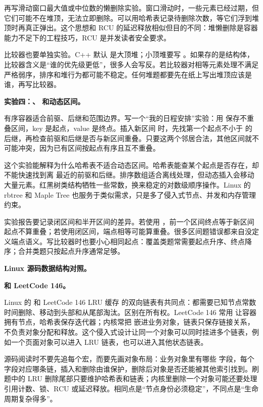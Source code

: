 再写滑动窗口最大值或中位数的懒删除实验。窗口滑动时，一些元素已经过期，但它们可能不在堆顶，无法立即删除。可以用哈希表记录待删除次数，等它们浮到堆顶时再真正弹出。这个思想和 RCU 的延迟释放相似但目的不同：堆懒删除是容器能力不足下的工程技巧，RCU 是并发读者安全要求。

比较器也要单独实验。C++ 默认  是大顶堆；小顶堆要写 。如果存的是结构体，比较器含义是“谁的优先级更低”，很多人会写反。若比较器对相等元素处理不满足严格弱序，排序和堆行为都可能不稳定。任何堆题都要先在纸上写出堆顶应该是谁，再写比较器。

\noindent\textbf{实验四：、 和动态区间。}

有序容器适合前驱、后继和范围边界。写一个“我的日程安排”实验：用  保存不重叠区间，key 是起点，value 是终点。插入新区间 \code{[l,r)} 时，先找第一个起点不小于  的后继，再检查前驱和后继是否与新区间重叠。只要这两个邻居合法，其他区间就不可能冲突，因为已有区间按起点有序且互不重叠。

这个实验能解释为什么哈希表不适合动态区间。哈希表能查某个起点是否存在，却不能快速找到离  最近的前驱和后继。排序数组适合离线处理，但动态插入会移动大量元素。红黑树类结构牺牲一些常数，换来稳定的对数级顺序操作。Linux 的 rbtree 和 Maple Tree 也服务于类似需求，只是多了侵入式节点、并发和内存管理约束。

实验报告要记录闭区间和半开区间的差异。若使用 \code{[l,r)}，前一个区间终点等于新区间起点不算重叠；若使用闭区间，端点相等可能算重叠。很多区间题错误都来自没定义端点语义。写比较器时也要小心相同起点：覆盖类题常需要起点升序、终点降序；合并类题只按起点升序通常足够。

\noindent\textbf{Linux 源码数据结构对照。}

\noindent\textbf{ 和 LeetCode 146。}

Linux 的  和 LeetCode 146 LRU 缓存 的双向链表有共同点：都需要已知节点常数时间删除、移动到头部和从尾部淘汰。区别在所有权。LeetCode 146 常用  让容器拥有节点，哈希表保存迭代器；内核常把  嵌进业务对象，链表只保存链接关系，不负责对象分配和释放。这个侵入式设计让同一个对象可以同时挂进多个链表，例如一个页面对象可以进入 LRU 链表，也可以进入其他状态链表。

源码阅读时不要先追每个宏，而要先画对象布局：业务对象里有哪些  字段，每个字段对应哪条链，插入和删除由谁保护，删除后对象是否还能被其他索引找到。刷题中的 LRU 删除尾部只要维护哈希表和链表；内核里删除一个对象可能还要处理引用计数、锁、RCU 或延迟释放。相同点是“节点身份必须稳定”，不同点是“生命周期复杂得多”。


